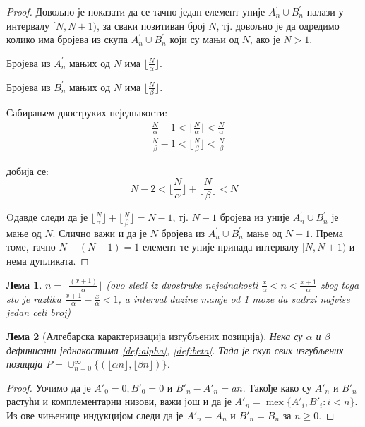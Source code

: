 \documentclass[a4paper]{article}
\newtheorem{lemma}{Лема}
\DeclareMathOperator{\mex}{mex}
\begin{document}
\begin{proof}
	Довољно је показати да се тачно један елемент уније $ A_{n}^{'} \cup B_{n}^{'} $ налази у интервалу $ [N,N+1) $, за сваки позитиван број $ N $, тј. довољно је да одредимо колико има бројева из скупа $ A_{n}^{'} \cup B_{n}^{'} $ који су мањи од $ N $, ако је $ N > 1 $.
	
	Бројева из $ A_{n}^{'} $ мањих од $ N $ има $ \lfloor \frac{N}{\alpha} \rfloor $.
	
	Бројева из $ B_{n}^{'} $ мањих од $ N $ има $ \lfloor \frac{N}{\beta} \rfloor $.
	
	Сабирањем двоструких неједнакости:
		\begin{eqnarray*}
			&\frac{N}{\alpha} - 1 < \lfloor \frac{N}{\alpha} \rfloor < \frac{N}{\alpha}\\
			&\frac{N}{\beta} - 1 < \lfloor \frac{N}{\beta} \rfloor < \frac{N}{\beta}
		\end{eqnarray*}
	
	добија се:
		\begin{displaymath}
		N - 2 < \lfloor \frac{N}{\alpha} \rfloor + \lfloor \frac{N}{\beta} \rfloor < N
		\end{displaymath} 
	
	Oдавде следи да је $ \lfloor \frac{N}{\alpha} \rfloor + \lfloor \frac{N}{\beta} \rfloor = N - 1 $, тј. $ N - 1 $ бројева из уније $ A_{n}^{'} \cup B_{n}^{'} $ је мање од $ N $. Слично важи и да је $ N $ бројева из $ A_{n}^{'} \cup B_{n}^{'} $ мање од $ N + 1 $. Према томе, тачно $ N - (N - 1) = 1 $ елемент те уније припада интервалу $ [N,N+1) $ и нема дупликата.
\end{proof}

\begin{lemma}
	\label{lemma:n}
	$ n = \lfloor \frac{(x+1)}{\alpha} \rfloor $
	(ovo sledi iz dvostruke nejednakosti
	$\frac{x}{\alpha}<n<\frac{x+1}{\alpha}$
	zbog toga sto je razlika
	$\frac{x+1}{\alpha}-\frac{x}{\alpha}<1$,
	a interval duzine manje od 1 moze da sadrzi najvise jedan celi broj)
\end{lemma}


\begin{lemma}[Алгебарска карактеризација изгубљених позиција] Нека су $ \alpha $ и $ \beta $ дефинисани једнакостима \eqref{def:alpha}, \eqref{def:beta}. Тада је скуп свих изгубљених позиција $ P = \cup_{n=0}^{\infty} \{(\lfloor \alpha n \rfloor, \lfloor \beta n \rfloor)\} $.
\end{lemma}

\begin{proof}
	Уочимо да је $ A'_{0} = 0, B'_{0} = 0 $ и $ B'_{n} - A'_{n} = an $. Такође како су $ A'_{n} $ и $ B'_{n} $ растући и комплементарни низови, важи још и да је $ A'_{n} = \mex \{ A'_{i}, B'_{i} : i < n \} $. Из ове чињенице индукцијом следи да је $ A'_{n} = A_{n} $ и $ B'_{n} = B_{n}  $ за $ n \ge 0 $.
\end{proof}
\end{document}
